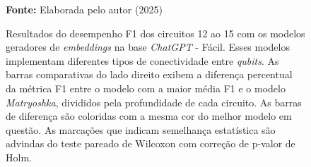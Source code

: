\begin{figure}
\caption{Resultados do desempenho F1 dos circuitos 12 ao 15 com os modelos geradores de \textit{embeddings} na base \textit{ChatGPT} - Fácil. Esses modelos implementam diferentes tipos de conectividade entre \textit{qubits}. As barras comparativas do lado direito exibem a diferença percentual da métrica F1 entre o modelo com a maior média F1 e o modelo \textit{Matryoshka}, divididos pela profundidade de cada circuito. As barras de diferença são coloridas com a mesma cor do melhor modelo em questão. As marcações que indicam semelhança estatística são advindas do teste pareado de Wilcoxon com correção de p-valor de Holm.}
\label{fig:model_transformer:easy:g3}
     \centering
    \centering

      \par\medskip\ABNTEXfontereduzida\selectfont\textbf{Fonte:} Elaborada pelo autor (2025) \par\medskip
\end{figure}